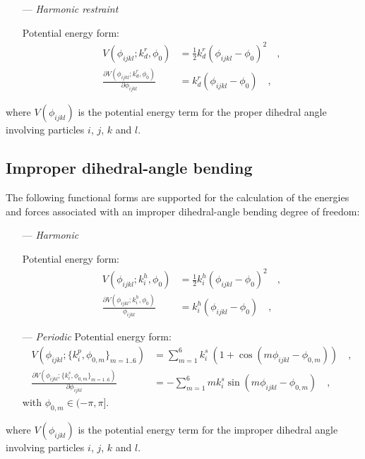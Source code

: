\documentclass[10pt,a4paper,openany]{memoir}
\numberwithin{equation}{section}
\begin{document}
\begin{itemize}
\item [---]\textit{Harmonic restraint}
  \par
  Potential energy form:
  \begin{align}
  \label{eq:proper-restraint-energy}
  V(\phi_{ijkl}; k_d^r, \phi_0) & = \frac{1}{2} k_d^r (\phi_{ijkl} - \phi_0)^2 \quad , \\ \nonumber
  \frac{\partial V(\phi_{ijkl}; k_d^r, \phi_0)}{\partial \phi_{ijkl}} & = k_d^r (\phi_{ijkl} - \phi_0) \quad , 
\end{align}
\end{itemize}
where $V(\phi_{ijkl})$ is the potential energy term for the proper dihedral angle involving particles $i$, $j$, $k$ and $l$.

\subsection{Improper dihedral-angle bending}
\label{sec:improper-terms}

The following functional forms are supported for the calculation of
the energies and forces associated with an improper dihedral-angle
bending degree of freedom:\cite{GROMOS-doc,GROMACS-doc}

\begin{itemize}
\item[---] \textit{Harmonic}
  \par
  Potential energy form:  
\begin{align}
  \label{eq:improper-harmonic-energy}
  V(\phi_{ijkl}; k_i^h, \phi_0) & =  \frac{1}{2} k_i^h (\phi_{ijkl} - \phi_0)^2 \quad , \\ \nonumber
  \frac{\partial V(\phi_{ijkl}; k_i^h, \phi_0)}{\phi_{ijkl}} & = k_i^h (\phi_{ijkl} - \phi_0) \quad ,
\end{align}
\item [---] \textit{Periodic}
  Potential energy form:
  \begin{align}
    \label{eq:improper-periodic-energy}
    V(\phi_{ijkl} ; \{k_{i}^p, \phi_{0,m}\}_{m=1..6}) & = \sum_{m=1}^{6} k_{i}^s\ (1 + \cos{( m \phi_{ijkl} - \phi_{0,m})})\quad , \\ \nonumber
    \frac{\partial V(\phi_{ijkl} ; \{k_{i}^s, \phi_{0,m}\}_{m=1..6})}{\partial \phi_{ijkl}} & = -\sum_{m=1}^{6} m k_{i}^s \sin{(m \phi_{ijkl} - \phi_{0,m})}\quad ,
  \end{align}
  with $\phi_{0,m} \in (-\pi, \pi]$.  
 \end{itemize}
 where $V(\phi_{ijkl})$ is the potential energy term for the improper dihedral angle involving particles $i$, $j$, $k$ and $l$.
\end{document}
